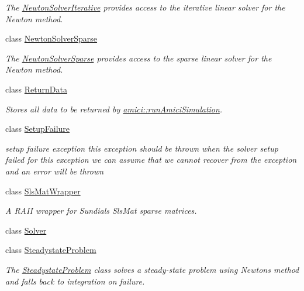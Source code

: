 \begin{DoxyCompactItemize}
\begin{DoxyCompactList}\small\item\em The \mbox{\hyperlink{classamici_1_1_newton_solver_iterative}{Newton\+Solver\+Iterative}} provides access to the iterative linear solver for the Newton method. \end{DoxyCompactList}\item 
class \mbox{\hyperlink{classamici_1_1_newton_solver_sparse}{Newton\+Solver\+Sparse}}
\begin{DoxyCompactList}\small\item\em The \mbox{\hyperlink{classamici_1_1_newton_solver_sparse}{Newton\+Solver\+Sparse}} provides access to the sparse linear solver for the Newton method. \end{DoxyCompactList}\item 
class \mbox{\hyperlink{classamici_1_1_return_data}{Return\+Data}}
\begin{DoxyCompactList}\small\item\em Stores all data to be returned by \mbox{\hyperlink{namespaceamici_a025192a6f53e19eae958cd3b14786f80}{amici\+::run\+Amici\+Simulation}}. \end{DoxyCompactList}\item 
class \mbox{\hyperlink{classamici_1_1_setup_failure}{Setup\+Failure}}
\begin{DoxyCompactList}\small\item\em setup failure exception this exception should be thrown when the solver setup failed for this exception we can assume that we cannot recover from the exception and an error will be thrown \end{DoxyCompactList}\item 
class \mbox{\hyperlink{classamici_1_1_sls_mat_wrapper}{Sls\+Mat\+Wrapper}}
\begin{DoxyCompactList}\small\item\em A R\+A\+II wrapper for Sundials Sls\+Mat sparse matrices. \end{DoxyCompactList}\item 
class \mbox{\hyperlink{classamici_1_1_solver}{Solver}}
\item 
class \mbox{\hyperlink{classamici_1_1_steadystate_problem}{Steadystate\+Problem}}
\begin{DoxyCompactList}\small\item\em The \mbox{\hyperlink{classamici_1_1_steadystate_problem}{Steadystate\+Problem}} class solves a steady-\/state problem using Newton\textquotesingle{}s method and falls back to integration on failure. \end{DoxyCompactList}\end{DoxyCompactItemize}
